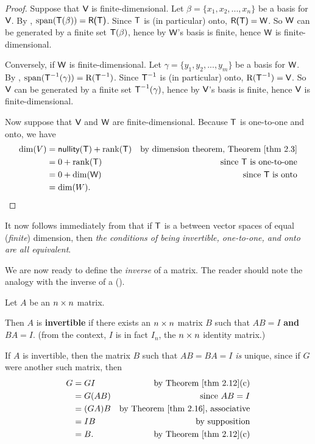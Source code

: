 \begin{proof}
Suppose that \(\textsf{V}\) is finite-dimensional. Let \(\beta = \{ x_1, x_2, ..., x_n \}\) be a basis for \(\textsf{V}\).
By , \(\operatorname{span}(\textsf{T}(\beta)) = \textsf{R(T)}\).
Since \(\textsf{T}\) is (in particular) onto, \(\textsf{R(T)} = \textsf{W}\).
So \(\textsf{W}\) can be generated by a finite set \(\textsf{T}(\beta)\), hence by  \(\textsf{W}\)'s basis is finite, hence \(\textsf{W}\) is finite-dimensional.

Conversely, if \(\textsf{W}\) is finite-dimensional. Let \(\gamma = \{ y_1, y_2, ..., y_m \}\) be a basis for \(\textsf{W}\).
By , \(\operatorname{span}(\textsf{T}^{-1}(\gamma)) = \mathrm{R}(\textsf{T}^{-1})\).
Since \(\textsf{T}^{-1}\) is (in particular) onto, \(\mathrm{R}(\textsf{T}^{-1}) = \textsf{V}\).
So \(\textsf{V}\) can be generated by a finite set \(\textsf{T}^{-1}(\gamma)\), hence by  \(\textsf{V}\)'s basis is finite, hence \(\textsf{V}\) is finite-dimensional.

Now suppose that \(\textsf{V}\) and \(\textsf{W}\) are finite-dimensional.
Because \(\textsf{T}\) is one-to-one and onto, we have
\begin{align*}
    \dim(V) & = \nullityT + \rankT & \text{by dimension theorem, \THM{2.3}} \\
            & = 0 + \rankT & \text{since \(\T\) is one-to-one} \\
            & = 0 + \dim(\W) & \text{since \(\T\) is onto} \\
            & = \dim(W).
\end{align*}
\end{proof}

\begin{remark} \label{remark 2.4.1}
It now follows immediately from  that if \(\textsf{T}\) is a \LTRAN{} between vector spaces of equal (\emph{finite}) dimension, then \emph{the conditions of being invertible, one-to-one, and onto are all equivalent}.
\end{remark}

We are now ready to define the \emph{inverse} of a matrix.
The reader should note the analogy with the inverse of a \LTRAN{}().

\begin{definition} \label{def 2.13}
Let \(A\) be an \(n \times n\) matrix.

 Then \(A\) is \textbf{invertible} if there exists an \(n \times n\) matrix \(B\) such that \(AB = I\) \textbf{and} \(BA = I\).
(from the context, \(I\) is in fact \(I_n\), the \(n \times n\) identity matrix.)
\end{definition}

 If \(A\) is invertible, then the matrix \(B\) such that \(AB = BA = I\) \emph{is} unique, since if \(G\) were another such matrix, then
\begin{align*}
    G & = GI & \text{by \THM{2.12}(c)} \\
      & = G(AB) & \text{since \(AB = I\)} \\
      & = (GA)B & \text{by \THM{2.16}, associative} \\
      & = IB & \text{by supposition} \\
      & = B. & \text{by \THM{2.12}(c)}
\end{align*}

